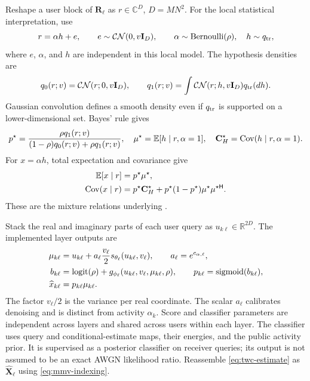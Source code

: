 Reshape a user block of $\mathbf R_\ell$ as $r\in\mathbb C^D$,
$D=MN^2$. For the local statistical interpretation, use
\begin{equation}
 r=\alpha h+e,\qquad e\sim\mathcal{CN}(0,v\mathbf{I}_D),\qquad
 \alpha\sim\operatorname{Bernoulli}(\rho),\quad h\sim q_{\rm tr},
 \label{eq:twc-local-model}
\end{equation}
where $e$, $\alpha$, and $h$ are independent in this local model.
The hypothesis densities are
\begin{equation}
 q_0(r;v)=\mathcal{CN}(r;0,v\mathbf{I}_D),\qquad
 q_1(r;v)=\int\mathcal{CN}(r;h,v\mathbf{I}_D)q_{\rm tr}(dh).
 \label{eq:twc-local-densities}
\end{equation}
Gaussian convolution defines a smooth density even if $q_{\rm tr}$
is supported on a lower-dimensional set. Bayes' rule gives
\begin{equation}
 p^\star=\frac{\rho q_1(r;v)}{(1-\rho)q_0(r;v)+\rho q_1(r;v)},\quad
 \mu^\star=\mathbb{E}[h\mid r,\alpha=1],\quad
 \mathbf C_H^\star=\operatorname{Cov}(h\mid r,\alpha=1).
 \label{eq:twc-local-targets}
\end{equation}
For $x=\alpha h$, total expectation and covariance give
\begin{align}
 \mathbb{E}[x\mid r]&=p^\star\mu^\star,
 \label{eq:twc-mixture-mean}\\
 \operatorname{Cov}(x\mid r)&=p^\star\mathbf C_H^\star+
 p^\star(1-p^\star)\mu^\star\mu^{\star\mathsf H}.
 \label{eq:twc-mixture-covariance}
\end{align}
These are the mixture relations underlying
\cite[eqs.~(35)--(38)]{cai2026}.

Stack the real and imaginary parts of each user query as
$u_{k\ell}\in\mathbb R^{2D}$. The implemented layer outputs are
\begin{align}
 \mu_{k\ell}&=u_{k\ell}+a_\ell\frac{v_\ell}{2}
 s_{\theta_\ell}(u_{k\ell},v_\ell),\qquad a_\ell=e^{c_{\alpha,\ell}},
 \label{eq:twc-conditional-mean}\\
 b_{k\ell}&=\operatorname{logit}(\rho)+
 g_{\phi_\ell}(u_{k\ell},v_\ell,\mu_{k\ell},\rho),\qquad
 p_{k\ell}=\operatorname{sigmoid}(b_{k\ell}),
 \label{eq:twc-activity}\\
 \widehat x_{k\ell}&=p_{k\ell}\mu_{k\ell}.
 \label{eq:twc-estimate}
\end{align}
The factor $v_\ell/2$ is the variance per real coordinate. The scalar
$a_\ell$ calibrates denoising and is distinct from activity $\alpha_k$.
Score and classifier parameters are independent across layers and
shared across users within each layer. The classifier uses query and
conditional-estimate maps, their energies, and the public activity prior.
It is supervised as a posterior classifier on receiver queries; its
output is not assumed to be an exact AWGN likelihood ratio.
Reassemble \eqref{eq:twc-estimate} as $\widehat{\mathbf X}_\ell$
using \eqref{eq:mmv-indexing}.

